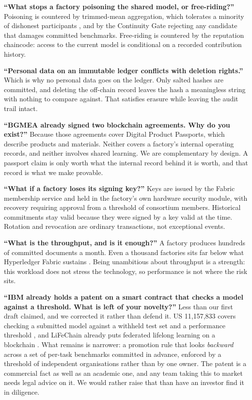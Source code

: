 \documentclass[11pt,a4paper]{article}
\begin{document}
\textbf{``What stops a factory poisoning the shared model, or free-riding?''}
Poisoning is countered by trimmed-mean aggregation, which tolerates a minority
of dishonest participants \citep{yin2018byzantine,bagdasaryan2020backdoor}, and
by the Continuity Gate rejecting any candidate that damages committed
benchmarks. Free-riding is countered by the reputation chaincode: access to the
current model is conditional on a recorded contribution history.

\textbf{``Personal data on an immutable ledger conflicts with deletion
rights.''}
Which is why no personal data goes on the ledger. Only salted hashes are
committed, and deleting the off-chain record leaves the hash a meaningless
string with nothing to compare against. That satisfies erasure while leaving the
audit trail intact.

\textbf{``BGMEA already signed two blockchain agreements. Why do you exist?''}
Because those agreements cover Digital Product Passports, which describe
products and materials. Neither covers a factory's internal operating records,
and neither involves shared learning. We are complementary by design. A passport
claim is only worth what the internal record behind it is worth, and that record
is what we make provable.

\textbf{``What if a factory loses its signing key?''}
Keys are issued by the Fabric membership service and held in the factory's own
hardware security module, with recovery requiring approval from a threshold of
consortium members. Historical commitments stay valid because they were signed
by a key valid at the time. Rotation and revocation are ordinary transactions,
not exceptional events.

\textbf{``What is the throughput, and is it enough?''}
A factory produces hundreds of committed documents a month. Even a thousand
factories sits far below what Hyperledger Fabric sustains
\citep{androulaki2018fabric,dinh2018untangling}. Being unambitious about
throughput is a strength: this workload does not stress the technology, so
performance is not where the risk sits.

\textbf{``IBM already holds a patent on a smart contract that checks a model
against a threshold. What is left of your novelty?''}
Less than our first draft claimed, and we corrected it rather than defend it.
US 11{,}157{,}833 covers checking a submitted model against a withheld test set
and a performance threshold \citep{calmon2021patent}, and LiFeChain already puts
federated lifelong learning on a blockchain \citep{chen2025lifechain}. What
remains is narrower: a promotion rule that looks \emph{backward} across a set of
per-task benchmarks committed in advance, enforced by a threshold of independent
organisations rather than by one owner. The patent is a commercial fact as well
as an academic one, and any team taking this to market needs legal advice on it.
We would rather raise that than have an investor find it in diligence.
\end{document}
